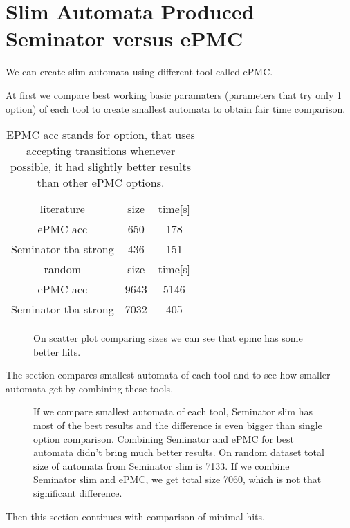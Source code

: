 \documentclass[
	digital,
nolof, nolot
]{fithesis3}
\newcommand{\hlineny}{\hline}
\begin{document}
		\section{Slim Automata Produced Seminator versus ePMC}
		We can create slim automata using different tool called ePMC.
		
		At first we compare best working basic paramaters (parameters that try only 1 option) of each tool to create smallest automata to obtain fair time comparison.
	
	\begin{table}[ht]
		\centering
		\caption{EPMC acc stands for option, that uses accepting transitions whenever possible, it had slightly better results than other ePMC options. }
		\begin{tabular}{ |c||c|c| } 
			\hline
			literature&size&time[s]\\
			\hhline{|===|}
			ePMC acc&650 &178 \\
			\hline
			Seminator tba strong &436 &151 \\
			\hlineny
			\hline
			random&size&time[s]\\
			\hhline{|===|}
			ePMC acc&9643 & 5146\\
			\hline
			Seminator tba strong &7032 &405 \\
			\hlineny
		\end{tabular}
	\end{table}
	\begin{figure}[ht]
		\centering
		\caption{On scatter plot comparing sizes we can see that epmc has some better hits.}
		\begin{tikzpicture}
			
		\end{tikzpicture}
	\end{figure}
	
	
		The section compares smallest automata of each tool and to see how smaller automata get by combining these tools.
	
\begin{figure}[ht]
	\centering
	\caption{If we compare smallest automata of each tool, Seminator slim has most of the best results and the difference is even bigger than single option comparison. Combining Seminator and ePMC for best automata didn't bring much better results. On random dataset total size of automata from Seminator slim is 7133. If we combine Seminator slim and ePMC, we get total size 7060, which is not that significant difference.}
	\begin{tikzpicture}
		
	\end{tikzpicture}
\end{figure}
Then this section continues with comparison of minimal hits.
\end{document}
